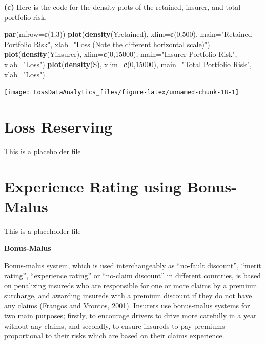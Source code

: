 \documentclass[]{book}
\newenvironment{Shaded}{\begin{snugshade}}{\end{snugshade}}
\newcommand{\KeywordTok}[1]{\textcolor[rgb]{0.13,0.29,0.53}{\textbf{{#1}}}}
\newcommand{\DataTypeTok}[1]{\textcolor[rgb]{0.13,0.29,0.53}{{#1}}}
\newcommand{\DecValTok}[1]{\textcolor[rgb]{0.00,0.00,0.81}{{#1}}}
\newcommand{\StringTok}[1]{\textcolor[rgb]{0.31,0.60,0.02}{{#1}}}
\newcommand{\NormalTok}[1]{{#1}}
\theoremstyle{definition}
\theoremstyle{definition}
\theoremstyle{definition}
\theoremstyle{remark}
\begin{document}
\textbf{(c)} Here is the code for the density plots of the retained,
insurer, and total portfolio risk.

\begin{Shaded}
\begin{Highlighting}[]
\KeywordTok{par}\NormalTok{(}\DataTypeTok{mfrow=}\KeywordTok{c}\NormalTok{(}\DecValTok{1}\NormalTok{,}\DecValTok{3}\NormalTok{))}
\KeywordTok{plot}\NormalTok{(}\KeywordTok{density}\NormalTok{(Yretained), }\DataTypeTok{xlim=}\KeywordTok{c}\NormalTok{(}\DecValTok{0}\NormalTok{,}\DecValTok{500}\NormalTok{), }\DataTypeTok{main=}\StringTok{"Retained Portfolio Risk"}\NormalTok{, }\DataTypeTok{xlab=}\StringTok{"Loss (Note the different horizontal scale)"}\NormalTok{)}
\KeywordTok{plot}\NormalTok{(}\KeywordTok{density}\NormalTok{(Yinsurer), }\DataTypeTok{xlim=}\KeywordTok{c}\NormalTok{(}\DecValTok{0}\NormalTok{,}\DecValTok{15000}\NormalTok{), }\DataTypeTok{main=}\StringTok{"Insurer Portfolio Risk"}\NormalTok{, }\DataTypeTok{xlab=}\StringTok{"Loss"}\NormalTok{)}
\KeywordTok{plot}\NormalTok{(}\KeywordTok{density}\NormalTok{(S), }\DataTypeTok{xlim=}\KeywordTok{c}\NormalTok{(}\DecValTok{0}\NormalTok{,}\DecValTok{15000}\NormalTok{), }\DataTypeTok{main=}\StringTok{"Total Portfolio Risk"}\NormalTok{, }\DataTypeTok{xlab=}\StringTok{"Loss"}\NormalTok{)}
\end{Highlighting}
\end{Shaded}

\begin{center}\texttt{[image: LossDataAnalytics\_files/figure-latex/unnamed-chunk-18-1]} \end{center}

\chapter{Loss Reserving}\label{C:LossReserves}

This is a placeholder file

\chapter{Experience Rating using Bonus-Malus}\label{C:BonusMalus}

This is a placeholder file

\textbf{Bonus-Malus}

Bonus-malus system, which is used interchangeably as ``no-fault
discount'', ``merit rating'', ``experience rating'' or ``no-claim
discount'' in different countries, is based on penalizing insureds who
are responsible for one or more claims by a premium surcharge, and
awarding insureds with a premium discount if they do not have any claims
(Frangos and Vrontos, 2001). Insurers use bonus-malus systems for two
main purposes; firstly, to encourage drivers to drive more carefully in
a year without any claims, and secondly, to ensure insureds to pay
premiums proportional to their risks which are based on their claims
experience.
\end{document}
